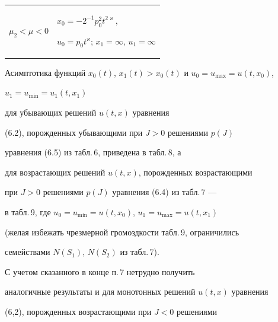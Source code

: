 \begin{center}
\begin{tabular}{|p{2.6cm}|p{13cm}|}
\hline 


$\mu_2<\mu<0$ & 


\parbox{13cm}{$x_0=-2^{-1}p^2_0t^{2\varkappa}$, 


$u_0=p_0t^\varkappa$; $x_1=\infty$, $u_1=\infty$}\\ 


\hline 


$\mu>0$ & 


\parbox{13cm}{$x_0=-2^{-1}p^2_0t^{2\varkappa}$, 


$u_0=p_0t^\varkappa$; $x_1\sim -p_0t^{2\varkappa}\big( 


\frac{p_0}{2}-\frac{t^{1-\varkappa}}{\beta d^\beta_1}\big)$, 


$u_1\sim p_0t^\varkappa\big(1- 


\frac{\chi t^{1-\varkappa}}{p_0d^\beta_1}\big)$}\\ 


\hline 


\end{tabular} 


\end{center} 





 


Асимптотика функций $x_0(t)$, $x_1(t)>x_0(t)$ и $u_0=u_{\max}=u(t,x_0)$, 


$u_1=u_{\min}=u_1(t,x_1)$ 


для убывающих решений $u(t,x)$ уравнения  


(6.2), порожденных убывающими при $J>0$ решениями $p(J)$ 


уравнения (6.5) из табл.\,6, приведена в табл.\,8, а 


для возрастающих решений $u(t,x)$, порожденных возрастающими  


при $J>0$ решениями $p(J)$ уравнения (6.4) из табл.\,7 --- 


в табл.\,9, где $u_0=u_{\min}=u(t,x_0)$, $u_1=u_{\max}=u(t,x_1)$ 


(желая избежать чрезмерной громоздкости табл.\,9, ограничились  


семействами $N(S_1)$, $N(S_2)$ из табл.\,7). 


 


С учетом сказанного в конце п.\,7 нетрудно получить  


аналогичные результаты и для монотонных решений $u(t,x)$ уравнения  


(6,2), порожденных возрастающими при $J<0$ решениями  


